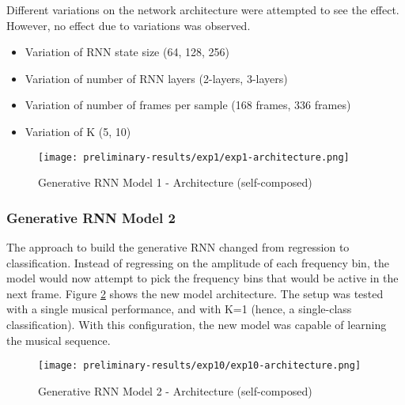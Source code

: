 \documentclass[../main.tex]{subfiles}
\begin{document}
\iffalse
 Figure \ref{fig:exp1-performance} shows the model loss when trained for 500 epochs.
\fi
 

\par
Different variations on the network architecture were attempted to see the effect. However, no effect due to variations was observed.
\begin{itemize}
    \item Variation of RNN state size (64, 128, 256)
    \item Variation of number of RNN layers (2-layers, 3-layers)
    \item Variation of number of frames per sample (168 frames, 336 frames)
    \item Variation of K (5, 10)
\end{itemize}



\begin{figure}[H]
    \centering
    \texttt{[image: preliminary-results/exp1/exp1-architecture.png]}
    \caption{Generative RNN Model 1 - Architecture (self-composed)}
    \label{fig:exp1-architecture}
\end{figure}


\iffalse
\begin{figure}[H]
    \centering
    \texttt{[image: preliminary-results/exp1/exp1-performance.png]}
    \caption{Generative RNN Model 1 - Performance}
    \label{fig:exp1-performance}
\end{figure}
\fi

\subsubsection{Generative RNN Model 2}

\par
The approach to build the generative RNN changed from regression to classification. Instead of regressing on the amplitude of each frequency bin, the model would now attempt to pick the frequency bins that would be active in the next frame. Figure \ref{fig:exp10-architecture} shows the new model architecture. The setup was tested with a single musical performance, and with K=1 (hence, a single-class classification). With this configuration, the new model was capable of learning the musical sequence. 
\iffalse
Figure \ref{fig:exp10-performance} shows the model loss when trained for 500 epochs.
\fi

\begin{figure}[H]
    \centering
    \texttt{[image: preliminary-results/exp10/exp10-architecture.png]}
    \caption{Generative RNN Model 2 - Architecture (self-composed)}
    \label{fig:exp10-architecture}
\end{figure}
\end{document}
